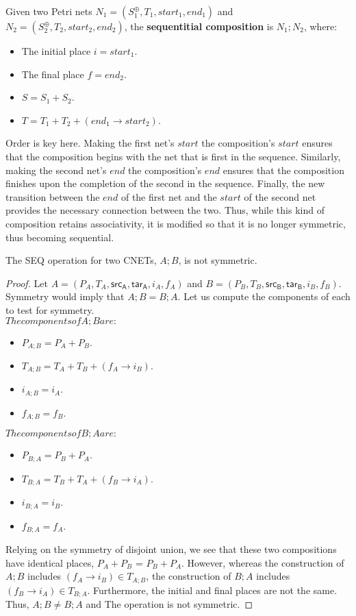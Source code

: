 \begin{definition}
  \label{def:SEQ-PN}
   Given two Petri nets $N_1 = (S_1^\oplus, T_1, start_1, end_1)$ and $N_2 = (S_2^\oplus, T_2, start_2, end_2)$, the \textbf{sequentitial composition} is  $N_1 ; N_2$, where: 
\begin{itemize} 
\item The initial place $i = start_1$.
\item The final place $f = end_2$.
\item $S = S_1 + S_2$.\\
\item $T = T_1 + T_2 + (end_1 \to start_2)$.
\end{itemize}
Order is key here. Making the first net's $start$ the composition's $start$ ensures that the composition begins with the net that is first in the sequence. Similarly, making the second net's $end$ the composition's $end$ ensures that the composition finishes upon the completion of the second in the sequence. Finally, the new transition between the $end$ of the first net and the $start$ of the second net provides the necessary connection between the two. Thus, while this kind of composition retains associativity, it is modified so that it is no longer symmetric, thus becoming sequential. 
\end{definition}
\begin {lemma}
 \label{lemma:SEQ-NOT-SYMM}
 The SEQ operation for two CNETs, $A;B$, is not symmetric. 
\end{lemma}
\begin{proof}
Let $A = (P_A, T_A, \mathsf{src_A}, \mathsf{tar_A}, i_A, f_A)$ and $B = (P_B, T_B, \mathsf{src_B}, \mathsf{tar_B}, i_B, f_B)$. Symmetry would imply that $A;B = B;A$. Let us compute the components of each to test for symmetry. \\
$The components of A;B are:$ 
\begin{itemize}
 \item $P_{A;B} = P_A + P_B$.
 \item $T_{A;B} = T_A + T_B + (f_A \to i_B)$.
 \item $i_{A;B} = i_A$.
 \item $f_{A;B} = f_B$.
\end{itemize}
$The components of B;A are:$ 
\begin{itemize}
 \item $P_{B;A} = P_B + P_A$.
 \item $T_{B;A} = T_B + T_A + (f_B \to i_A)$.
 \item $i_{B;A} = i_B$.
 \item $f_{B;A} = f_A$.
\end{itemize}
Relying on the symmetry of disjoint union, we see that these two compositions have identical places, $P_A + P_B$ = $P_B + P_A$. However, whereas the construction of $A;B$ includes $(f_A \to i_B) \in T_{A;B}$, the construction of $B;A$ includes $(f_B \to i_A) \in T_{B;A}.$ Furthermore, the initial and final places are not the same. Thus, $A;B \neq B;A$ and The operation is not symmetric. 
\end{proof}
